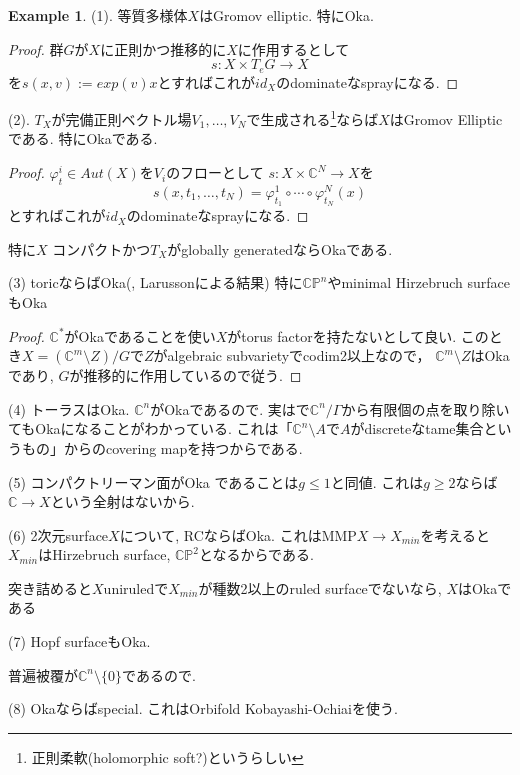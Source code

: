 \documentclass[dvipdfmx,a4paper,11pt]{article} %
\theoremstyle{definition}
\newtheorem{ex}[thm]{Example}
\theoremstyle{remark}
\numberwithin{equation}{section}
\newcommand{\C}{\mathbb{C}}
\begin{document}
\begin{ex}
(1). 等質多様体$X$はGromov elliptic. 特にOka.
\begin{proof}
群$G$が$X$に正則かつ推移的に$X$に作用するとして
$$
s : X \times T_{e}G \to X
$$
を$s(x,v):=exp(v)x$とすればこれが$id_X$のdominateなsprayになる.
\end{proof}

(2). $T_X$が完備正則ベクトル場$V_1, \ldots, V_N$で生成される\footnote{正則柔軟(holomorphic soft?)というらしい}ならば$X$はGromov Ellipticである.
特にOkaである. 
\begin{proof}
$\varphi^{i}_{t} \in Aut(X)$を$V_i$のフローとして
$s : X \times \C^N \to X$を
$$
s(x, t_1, \ldots, t_N)=\varphi^{1}_{t_1} \circ \cdots \circ \varphi^{N}_{t_N}(x) 
$$
とすればこれが$id_X$のdominateなsprayになる.
\end{proof}
特に$X$ コンパクトかつ$T_X$がglobally generatedならOkaである.

(3) toricならばOka(\cite[Theorem 2.17]{For13}, Larussonによる結果)
特に$\C\mathbb{P}^n$やminimal Hirzebruch surfaceもOka

\begin{proof}$\C^{*}$がOkaであることを使い$X$がtorus factorを持たないとして良い. 
このとき$X = (\C^m \setminus Z)/G$で$Z$がalgebraic subvarietyでcodim2以上なので， $\C^m \setminus Z$はOkaであり, $G$が推移的に作用しているので従う. 
\end{proof}

(4) トーラスはOka. $\C^n$がOkaであるので. 
実は\cite[Cor 2.25]{For13}で$\C^n/\Gamma$から有限個の点を取り除いてもOkaになることがわかっている. 
これは「$\C^n \setminus A$で$A$がdiscreteなtame集合というもの」からのcovering mapを持つからである. 

(5) コンパクトリーマン面がOka であることは$g \le 1$と同値.
これは$g\ge2$ならば$\C \to X$という全射はないから. 

(6) 2次元surface$X$について, RCならばOka.
これはMMP$X \to X_{min}$を考えると
$X_{min}$はHirzebruch surface, $\C\mathbb{P}^2$となるからである. 

突き詰めると$X$uniruledで$X_{min}$が種数2以上のruled surfaceでないなら, $X$はOkaである

(7) Hopf surfaceもOka.

普遍被覆が$\C^n \setminus \{0\}$であるので. 

(8) \cite[Section 8]{Cam04} Okaならばspecial. これはOrbifold Kobayashi-Ochiaiを使う. 

\end{ex}
\end{document}
